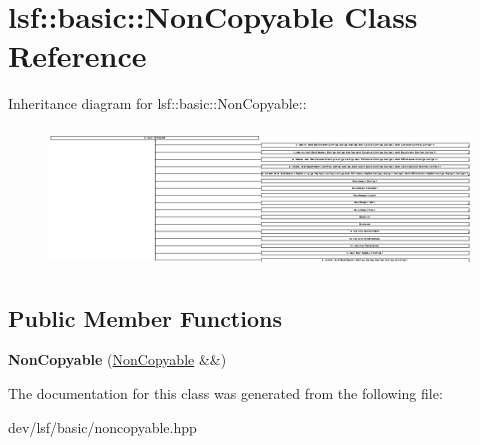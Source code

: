 \hypertarget{classlsf_1_1basic_1_1NonCopyable}{
\section{lsf::basic::NonCopyable Class Reference}
\label{classlsf_1_1basic_1_1NonCopyable}
}
Inheritance diagram for lsf::basic::NonCopyable::\begin{figure}[H]
\begin{center}
\leavevmode
\includegraphics[height=3.74721cm]{classlsf_1_1basic_1_1NonCopyable}
\end{center}
\end{figure}
\subsection*{Public Member Functions}
\begin{DoxyCompactItemize}
\item 
\hypertarget{classlsf_1_1basic_1_1NonCopyable_a73bcf9c859d45025ab19ce4bf0a77d79}{
{\bfseries NonCopyable} (\hyperlink{classlsf_1_1basic_1_1NonCopyable}{NonCopyable} \&\&)}
\label{classlsf_1_1basic_1_1NonCopyable_a73bcf9c859d45025ab19ce4bf0a77d79}

\end{DoxyCompactItemize}


The documentation for this class was generated from the following file:\begin{DoxyCompactItemize}
\item 
dev/lsf/basic/noncopyable.hpp\end{DoxyCompactItemize}
